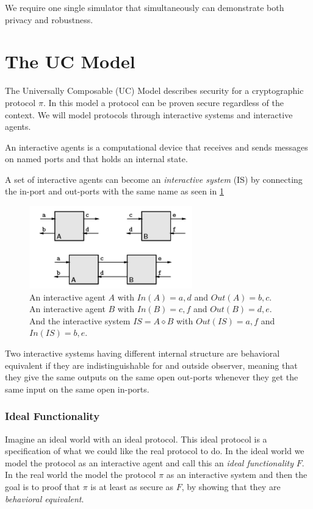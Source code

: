 We require one single simulator that simultaneously can demonstrate both privacy and robustness.

\section{The UC Model} 
The Universally Composable (UC) Model describes security for a cryptographic protocol $\pi$. In this model a protocol can be proven secure regardless of the context. We will model protocols through interactive systems and interactive agents\cite{mpc-book}.

\begin{mydef}
An interactive agents is a computational device that receives and sends messages on named ports and that holds an internal state.
\end{mydef}

\noindent A set of interactive agents can become an \emph{interactive system} (IS) by connecting the in-port and out-ports with the same name as seen in \ref{fig:IA_IS}

\begin{figure}[H]
    \centering
    \includegraphics{images/Interactive_systems.PNG}
    \caption{
    An interactive agent $A$ with $In(A)={a,d}$ and $Out(A)={b,c}$. \\
    An interactive agent $B$ with $In(B)={c,f}$ and $Out(B) = {d,e}$. \\
    And the interactive system $IS=A \diamond B$ with $Out(IS)={a,f}$ and $In(IS)={b,e}$. %
    }
    \label{fig:IA_IS}
\end{figure}

\begin{mydef}
Two interactive systems having different internal structure are behavioral equivalent if they are indistinguishable for and outside observer, meaning that they give the same outputs on the same open out-ports whenever they get the same input on the same open in-ports. 
\end{mydef}

\subsubsection{Ideal Functionality}
Imagine an ideal world with an ideal protocol. This ideal protocol is a specification of what we could like the real protocol to do. In the ideal world we model the protocol as an interactive agent and call this an \emph{ideal functionality} $F$. In the real world the model the protocol $\pi$ as an interactive system and then the goal is to proof that $\pi$ is at least as secure as $F$, by showing that they are \emph{behavioral equivalent}.

